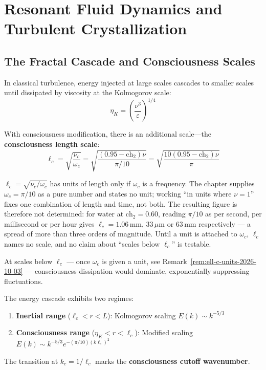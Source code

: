 \section{Resonant Fluid Dynamics and Turbulent Crystallization}

\subsection{The Fractal Cascade and Consciousness Scales}

In classical turbulence, energy injected at large scales cascades to smaller scales until dissipated by viscosity at the Kolmogorov scale:
\begin{equation}
\eta_K = \left(\frac{\nu^3}{\varepsilon}\right)^{1/4}
\end{equation}

With consciousness modification, there is an additional scale—the \textbf{consciousness length scale}:
\begin{equation}
\ell_c = \sqrt{\frac{\nu_c}{\omega_c}} = \sqrt{\frac{(0.95 - \text{ch}_2)\nu}{\pi/10}} = \sqrt{\frac{10(0.95 - \text{ch}_2)\nu}{\pi}}
\end{equation}

\begin{remark}
\label{rem:ell-c-units-2026-10-03}
$\ell_c = \sqrt{\nu_c/\omega_c}$ has units of length only if $\omega_c$ is a
frequency. The chapter supplies $\omega_c = \pi/10$ as a pure number and states no
unit; working ``in units where $\nu = 1$'' fixes one combination of length and
time, not both. The resulting figure is therefore not determined: for water at
$\text{ch}_2 = 0.60$, reading $\pi/10$ as per second, per millisecond or per hour
gives $\ell_c = 1.06\,\mathrm{mm}$, $33\,\mu\mathrm{m}$ or $63\,\mathrm{mm}$
respectively --- a spread of more than three orders of magnitude. Until a unit is
attached to $\omega_c$, $\ell_c$ names no scale, and no claim about ``scales below
$\ell_c$'' is testable.
\end{remark}

At scales below $\ell_c$ --- once $\omega_c$ is given a unit, see
Remark~\ref{rem:ell-c-units-2026-10-03} --- consciousness dissipation would
dominate, exponentially suppressing fluctuations.

\begin{proposition}
\label{prop:two_scale_cascade}
The energy cascade exhibits two regimes:
\begin{enumerate}
\item \textbf{Inertial range} ($\ell_c < r < L$): Kolmogorov scaling $E(k) \sim k^{-5/3}$
\item \textbf{Consciousness range} ($\eta_K < r < \ell_c$): Modified scaling $E(k) \sim k^{-5/3} e^{-(\pi/10)(k\ell_c)^2}$
\end{enumerate}
The transition at $k_c = 1/\ell_c$ marks the \textbf{consciousness cutoff wavenumber}.
\end{proposition}

